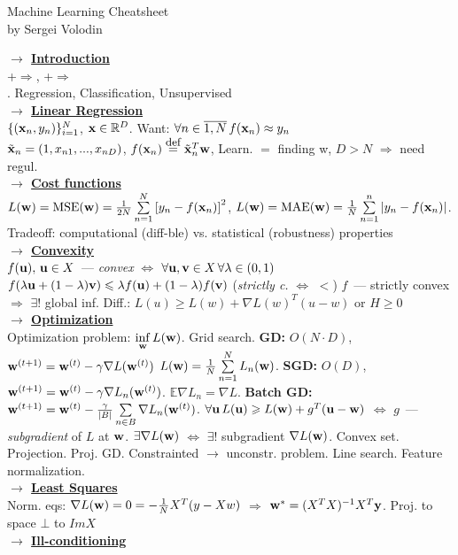 \documentclass[12pt]{article}
\newcommand{\myvector}[1]{{\bf{#1}}}
\newcommand{\x}{\myvector{x}}
\newcommand{\w}{\myvector{w}}
\newcommand{\uu}{\myvector{u}}
\newcommand{\vv}{\myvector{v}}
\newcommand{\eqdef}{\overset{\mbox{\small{def}}}{=}}
\newcommand{\mytitle}[1]{ {\bf $\rightarrow$ \underline{#1}}\\}
\begin{document}
\begin{center}
	{\large Machine Learning Cheatsheet}\\
	by Sergei Volodin
\end{center}
\begin{multicols*}{2}
\mytitle{Introduction}
+$\Rightarrow$, 
+$\Rightarrow$\\. Regression, Classification, Unsupervised\\
\mytitle{Linear Regression}
$\{(\x_n, y_n)\}_{i=1}^N$, $\x\in \mathbb{R}^D$. Want: $\forall n\in\overline{1, N}\,f(\x_n)\approx y_n$\\
$\tilde{\x}_n=(1,x_{n1},...,x_{nD})$, $f(\x_n)\eqdef \tilde{\x}_n^T\w$, Learn. $=$ finding w,
$D>N$ $\Rightarrow$ need regul.\\
\mytitle{Cost functions}
$L(\w)=\mbox{MSE}(\w)=\frac{1}{2N}\sum\limits_{n=1}^N\left[y_n-f(\x_n)\right]^2$,
$L(\w)=\mbox{MAE}(\w)=\frac{1}{N}\sum\limits_{n=1}^n\left|y_n-f(\x_n)\right|$. Tradeoff: computational (diff-ble) vs. statistical (robustness) properties\\
\mytitle{Convexity}
$f(\uu),\,\uu\in X$~--- {\em convex} $\Leftrightarrow$
$\forall \uu, \vv\in X\,\forall \lambda\in \left(0,1\right)$\\
$f(\lambda \uu + (1-\lambda) \vv)\leqslant \lambda f(\uu)+(1-\lambda)f(\vv)$ ({\em strictly c.} $\Leftrightarrow$ $<$)
$f$~--- strictly convex $\Rightarrow$ $\exists !$ global inf. Diff.: $L(u)\geqslant L(w)+\nabla L(w)^T(u-w)$ or $H\geqslant 0$\\
\mytitle{Optimization}
Optimization problem:
$\inf\limits_{\w}L(\w)$. Grid search.
{\bf GD:} $O(N\cdot D)$, $\w^{(t+1)}=\w^{(t)}-\gamma\nabla L(\w^{(t)})$ $L(\w)=\frac{1}{N}\sum\limits_{n=1}^N L_n(\w)$.
{\bf SGD:} $O(D)$, $\w^{(t+1)}=\w^{(t)}-\gamma\nabla L_n(\w^{(t)})$.
$\mathbb{E}\nabla L_n=\nabla L$.
{\bf Batch GD:}  $\w^{(t+1)}=\w^{(t)}-\frac{\gamma}{|B|} \sum\limits_{n\in B}\nabla L_n(\w^{(t)})$.
$\forall\uu\,L(\uu)\geqslant L(\w)+g^T(\uu-\w)$ $\Leftrightarrow$ $g$~--- {\em subgradient} of $L$ at $\w$. $\exists \nabla L(\w)$ $\Leftrightarrow$
$\exists!$ subgradient $\nabla L(\w)$. Convex set. Projection. Proj. GD. Constrainted $\rightarrow$ unconstr. problem. Line search. Feature normalization.\\
\mytitle{Least Squares}
Norm. eqs: $\nabla L(\w)=0=-\frac{1}{N}X^T(y-Xw)$
$\Rightarrow$ $\w^*=(X^TX)^{-1}X^T\myvector{y}$.
Proj. to space $\bot$ to $ImX$\\
\mytitle{Ill-conditioning}

\end{multicols*}
\end{document}
